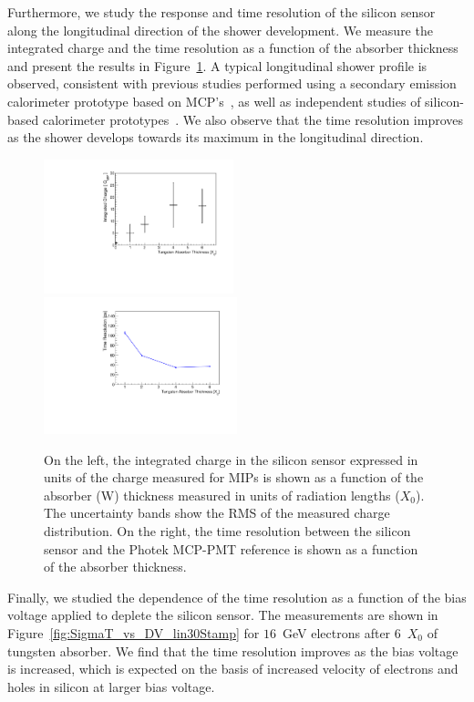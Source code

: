 \documentclass[12pt]{article}
\begin{document}
{Furthermore, we study the response and time resolution of the silicon sensor
along the longitudinal direction of the shower development. We measure the
integrated charge and the time resolution as a function of the absorber
thickness and present the results in Figure~\ref{fig:MIPVsAbsorberAt8GeV}. A
typical longitudinal shower profile is observed, consistent with previous
studies performed using a secondary emission calorimeter prototype based on
MCP's~\cite{MCPShowerMaxPaper}, as well as independent studies of silicon-based
calorimeter prototypes~\cite{Muhuri201424}. We also observe that the time
resolution improves as the shower develops towards its maximum in the
longitudinal direction. 

\begin{figure}[htbp] 
\centering
\includegraphics[width=0.49\textwidth]{plots/MIPVsAbsorberAt8GeV.pdf} 
\includegraphics[width=0.5\textwidth]{plots/SigmaT_vs_X0_lin30Stamp.pdf} 
\caption{On the left, the integrated charge in the silicon sensor expressed in units of the 
charge measured for MIPs is shown as a function of the absorber (W) thickness measured in
units of radiation lengths ($X_{0}$). The uncertainty bands show the RMS of the measured charge 
distribution. On the right, the time resolution between the silicon 
sensor and the Photek MCP-PMT reference is shown as a function of the 
absorber thickness.
} 
\label{fig:MIPVsAbsorberAt8GeV} 
\end{figure} 

Finally, we studied the dependence of the time resolution as a function of the
bias voltage applied to deplete the silicon sensor. The measurements are shown
in Figure~\ref{fig:SigmaT_vs_DV_lin30Stamp} for $16$~GeV electrons after
6~$X_0$ of tungsten absorber. We find that the time resolution
improves as the bias voltage is increased, which is expected on the basis of 
increased velocity of electrons and holes in silicon at larger bias voltage. 

}
\end{document}
